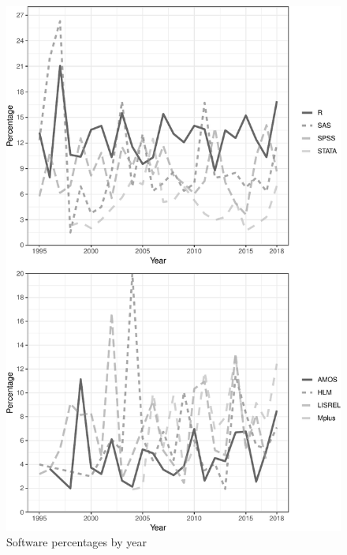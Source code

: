 \documentclass[english,,man]{apa6}
\begin{document}
\begin{figure}
\centering
\includegraphics{software_files/figure-latex/software-year-at1-1.pdf}
\caption{\label{fig:software-year-at1}Software percentages by year}
\end{figure}
\end{document}
